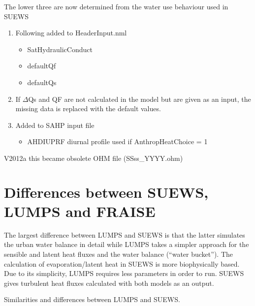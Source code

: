 \documentclass[letterpaper,10pt,english]{sphinxmanual}
\begin{document}
The lower three are now determined from the water use behaviour used in
SUEWS
\begin{enumerate}
\item {} 
Following added to HeaderInput.nml
\begin{itemize}
\item {} 
SatHydraulicConduct

\item {} 
defaultQf

\item {} 
defaultQs

\end{itemize}

\item {} 
If \(\Delta\)Qs and QF are not calculated in the model but are given as an
input, the missing data is replaced with the default values.

\item {} 
Added to SAHP input file
\begin{itemize}
\item {} 
AHDIUPRF \textendash{} diurnal profile used if AnthropHeatChoice = 1

\end{itemize}

\end{enumerate}

V2012a this became obsolete OHM file (SSss\_YYYY.ohm)


\chapter{Differences between SUEWS, LUMPS and FRAISE}
\label{\detokenize{differences-suews-lumps-fraise::doc}}\label{\detokenize{differences-suews-lumps-fraise:differences-between-suews-lumps-and-fraise}}
The largest difference between LUMPS and SUEWS is that the latter
simulates the urban water balance in detail while LUMPS takes a simpler
approach for the sensible and latent heat fluxes and the water balance
(“water bucket”). The calculation of evaporation/latent heat in SUEWS is
more biophysically based. Due to its simplicity, LUMPS requires less
parameters in order to run. SUEWS gives turbulent heat fluxes calculated
with both models as an output. 

Similarities and differences between LUMPS and SUEWS.
\end{document}
